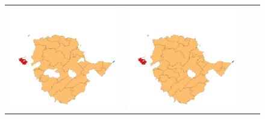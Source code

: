 \begin{figure}[p]
\begin{tabularx}{1\textwidth}{XXXX}
\includegraphics[width=1\linewidth]{images/ch6/contig/17}&
\includegraphics[width=1\linewidth]{images/ch6/contig/18}&

\end{tabularx}
\end{figure}
